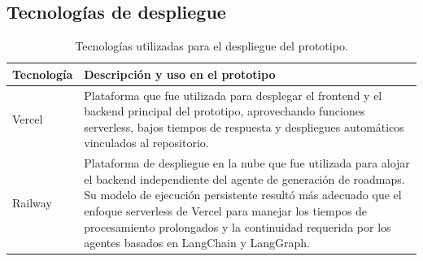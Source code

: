 \subsection{Tecnologías de despliegue}

\begin{table}[H]
\centering
\footnotesize
\begin{tabular}{| m{3.5cm} | m{11cm} |}
\hline
\textbf{Tecnología} & \textbf{Descripción y uso en el prototipo} \\
\hline
Vercel & Plataforma que fue utilizada para desplegar el frontend y el backend principal del prototipo, aprovechando funciones serverless, bajos tiempos de respuesta y despliegues automáticos vinculados al repositorio. \\
\hline
Railway & Plataforma de despliegue en la nube que fue utilizada para alojar el backend independiente del agente de generación de roadmaps. Su modelo de ejecución persistente resultó más adecuado que el enfoque serverless de Vercel para manejar los tiempos de procesamiento prolongados y la continuidad requerida por los agentes basados en LangChain y LangGraph. \\
\hline
\end{tabular}
\caption{Tecnologías utilizadas para el despliegue del prototipo.}
\end{table}


